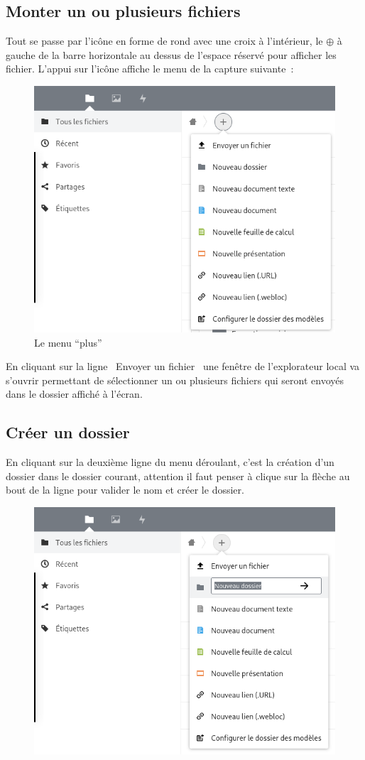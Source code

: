\subsection{Monter un ou plusieurs fichiers}
Tout se passe par l'icône en forme de rond avec une croix à l'intérieur, le {\Large $\oplus$} à gauche de la barre horizontale au dessus de l'espace réservé pour afficher les fichier. L'appui sur l'icône affiche le menu de la capture suivante~:
\begin{figure}
	\centering
	\includegraphics[width=0.7071\linewidth]{./Captures/nuage.menu.plus.png}
	\caption{Le menu ``plus''}
\end{figure}
En cliquant sur la ligne \og~Envoyer un fichier~\fg{} une fenêtre de l'explorateur local va s'ouvrir permettant de sélectionner un ou plusieurs fichiers qui seront envoyés dans le dossier affiché à l'écran.

\subsection{Créer un dossier}
En cliquant sur la deuxième ligne du menu déroulant, c'est la création d'un dossier dans le dossier courant, attention il faut penser à clique sur la flèche au bout de la ligne pour valider le nom et créer le dossier.
\begin{figure}
	\centering
	\includegraphics[width=0.7071\linewidth]{./Captures/nuage.menu.plus.creer.dossier.png}
	\caption{}
\end{figure}

